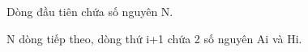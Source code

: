 Dòng đầu tiên chứa số nguyên N.  

   N dòng tiếp theo, dòng thứ i+1 chứa 2 số nguyên Ai và Hi.  

\